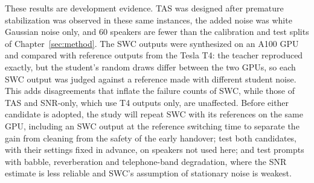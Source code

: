 These results are development evidence. TAS was designed after premature stabilization was observed in these same instances, the added noise was white Gaussian noise only, and 60 speakers are fewer than the calibration and test splits of Chapter~\ref{sec:method}. The SWC outputs were synthesized on an A100 GPU and compared with reference outputs from the Tesla T4: the teacher reproduced exactly, but the student's random draws differ between the two GPUs, so each SWC output was judged against a reference made with different student noise. This adds disagreements that inflate the failure counts of SWC, while those of TAS and SNR-only, which use T4 outputs only, are unaffected. Before either candidate is adopted, the study will repeat SWC with its references on the same GPU, including an SWC output at the reference switching time to separate the gain from cleaning from the safety of the early handover; test both candidates, with their settings fixed in advance, on speakers not used here; and test prompts with babble, reverberation and telephone-band degradation, where the SNR estimate is less reliable and SWC's assumption of stationary noise is weakest.

\FloatBarrier
